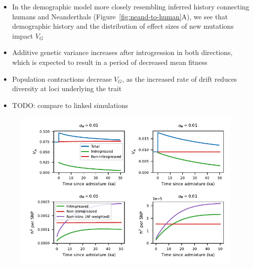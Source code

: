 \documentclass{article}
\begin{document}
\begin{itemize}
    \item In the demographic model more closely resembling inferred history
        connecting humans and Neanderthals (Figure~\ref{fig:neand-to-human}A),
        we see that demographic history and the distribution of effect sizes
        of new mutations impact $V_G$
    \item Additive genetic variance increases after introgression in both directions,
        which is expected to result in a period of decreased mean fitness
    \item Population contractions decrease $V_G$, as the increased rate of drift
        reduces diversity at loci underlying the trait
    \item TODO: compare to linked simulations
\end{itemize}

\begin{figure}[t!]
    \centering
    \includegraphics{../figures/human_admixture.pdf}
    \caption{
        \textbf{}
    }
    \label{fig:human-to-neand}
\end{figure}
\end{document}
